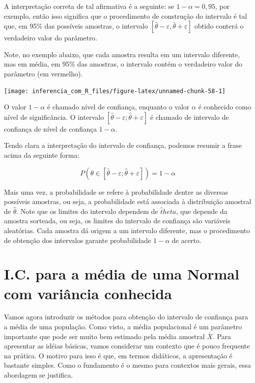 \documentclass[
]{book}
\begin{document}
A interpretação correta de tal afirmativa é a seguinte: se \(1-\alpha=0,95\), por exemplo, então isso significa que o procedimento de construção do intervalo é tal que, em 95\% das possíveis amostras, o intervalo \(\left[\hat\theta-\varepsilon,\hat\theta+\varepsilon\right]\) obtido conterá o verdadeiro valor do parâmetro.

Note, no exemplo abaixo, que cada amostra resulta em um intervalo diferente, mas em média, em 95\% das amostras, o intervalo contém o verdadeiro valor do parâmetro (em vermelho).

\begin{center}\texttt{[image: inferencia\_com\_R\_files/figure-latex/unnamed-chunk-58-1]} \end{center}

O valor \(1 - \alpha\) é chamado nível de confiança, enquanto o valor \(\alpha\) é conhecido como nível de significância. O intervalo \(\left[\hat\theta-\varepsilon;\hat\theta + \varepsilon\right]\) é chamado de intervalo de confiança de nível de confiança \(1 - \alpha\).

Tendo clara a interpretação do intervalo de confiança, podemos resumir a frase acima da seguinte forma:

\[P\left(\theta\in[\hat\theta-\varepsilon;\hat\theta+\varepsilon]\right)=1-\alpha\]

Mais uma vez, a probabilidade se refere à probabilidade dentre as diversas possíveis amostras, ou seja, a probabilidade está associada à distribuição amostral de \(\hat \theta\). Note que os limites do intervalo dependem de \(\hat theta\), que depende da amostra sorteada, ou seja, os limites do intervalo de confiança são variáveis aleatórias. Cada amostra dá origem a um intervalo diferente, mas o procedimento de obtenção dos intervalos garante probabilidade \(1 - \alpha\) de acerto.

\hypertarget{i.c.-para-a-muxe9dia-de-uma-normal-com-variuxe2ncia-conhecida}{%
\section{I.C. para a média de uma Normal com variância conhecida}\label{i.c.-para-a-muxe9dia-de-uma-normal-com-variuxe2ncia-conhecida}}

Vamos agora introduzir os métodos para obtenção do intervalo de confiança para a média de uma população. Como visto, a média populacional é um parâmetro importante que pode ser muito bem estimado pela média amostral \(\bar X\). Para apresentar as idéias básicas, vamos considerar um contexto que é pouco frequente na prática. O motivo para isso é que, em termos didáticos, a apresentação é bastante simples. Como o fundamento é o mesmo para contextos mais gerais, essa abordagem se justifica.
\end{document}

